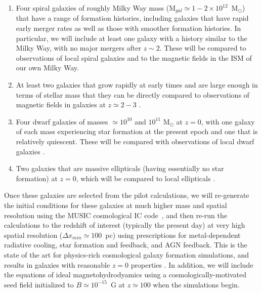 \begin{enumerate}

\item Four spiral galaxies of roughly Milky Way mass (M$_{gal} \simeq 1-2 \times
10^{12}$~M$_\odot$) that have a range of formation histories,
including galaxies that have rapid early merger rates as well as those
with smoother formation histories.  In particular, we will include at least one galaxy
with a history similar to the Milky Way, with no major
mergers after $z \sim 2$.  These will be compared to observations of
local spiral galaxies \cite[e.g.,][]{2014arXiv1411.1386V} and to the
magnetic fields in the ISM of our own Milky Way.

\item At least two galaxies that grow rapidly at early times and are
large enough in terms of stellar mass that they can be directly compared to observations of magnetic fields
in galaxies at $z \simeq 2-3$
\cite[e.g.,][]{2008Natur.454..302B,2008ApJ...676...70K,1998A&A...329..809A}.

\item Four dwarf galaxies of masses $\simeq 10^{10}$ and $10^{11}$
M$_\odot$ at $z=0$, with one galaxy of each mass experiencing star formation
at the present epoch and one that is relatively quiescent.  These will be compared with
observations of local dwarf galaxies
\cite{2000A&A...355..128C,2011A&A...529A..94C,2012MNRAS.423L.127R,Mao12,2013MNRAS.435..149N,2014A&A...567A.134J}.

\item Two galaxies that are massive ellipticals (having essentially no
star formation) at $z=0$, which will be compared to local ellipticals
\cite{1993A&ARv...4..449W,1996MNRAS.279..229M}.

\end{enumerate}

Once these galaxies are selected from the pilot calculations, we will re-generate the initial
conditions for these galaxies at much higher mass and spatial
resolution using the MUSIC cosmological IC
code~\cite{2011MNRAS.415.2101H}, and then re-run the calculations to
the redshift of interest (typically the present day) at very high
spatial resolution ($\Delta x_{min} \simeq 100$~pc) using
prescriptions for metal-dependent radiative cooling, star formation
and feedback, and AGN feedback.  This is the state of the art for
physics-rich cosmological galaxy formation simulations, and results in
galaxies with reasonable $z=0$ properties
\cite[e.g.,][]{2012MNRAS.423.1726S,2014MNRAS.444.1518V,2014MNRAS.445..581H}.
In addition, we will include the equations of ideal
magnetohydrodyamics using a cosmologically-motivated seed field
initialized to $B
\simeq 10^{-15}$~G at $z \simeq 100$ when the simulations begin.


